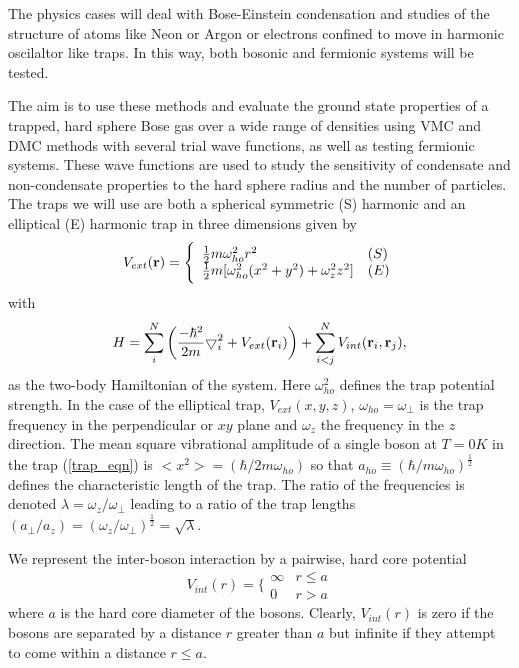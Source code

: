 \documentclass[%
oneside,                 %
final,                   %
10pt]{article}
\begin{document}
The physics cases will deal with Bose-Einstein condensation and studies
of the structure of atoms like Neon or Argon or electrons confined to move in harmonic oscilaltor like traps. 
In this way, both bosonic and fermionic systems will be tested.


The aim is to use these methods and evaluate 
the ground state properties of
a trapped, hard sphere Bose gas over a wide range of densities
using VMC and DMC  methods with several 
trial wave functions, as well as testing fermionic systems. These wave functions are used 
to study the sensitivity of condensate and 
non-condensate properties to the hard sphere radius and the number 
of particles.
The traps we will use are both a spherical symmetric (S) harmonic and 
an elliptical (E) harmonic trap in three dimensions given by 
 \begin{equation}
V_{ext}({\bf r}) = 
\Bigg\{
\begin{array}{ll}
        \frac{1}{2}m\omega_{ho}^2r^2 & (S)\\
\strut
	\frac{1}{2}m[\omega_{ho}^2(x^2+y^2) + \omega_z^2z^2] & (E)
\label{trap_eqn}
\end{array}
\end{equation}
with 
\begin{equation}
    H = \sum_i^N \left(
        \frac{-\hbar^2}{2m}
        { \bigtriangledown }_{i}^2 +
        V_{ext}({\bf{r}}_i)\right)  +
        \sum_{i<j}^{N} V_{int}({\bf{r}}_i,{\bf{r}}_j),
\end{equation}
as the two-body Hamiltonian of the system.
Here $\omega_{ho}^2$ defines the trap potential strength.  In the case of the
elliptical trap, $V_{ext}(x,y,z)$, $\omega_{ho}=\omega_{\perp}$ is the trap frequency
in the perpendicular or $xy$ plane and $\omega_z$ the frequency in the $z$
direction.
The mean square vibrational amplitude of a single boson at $T=0K$ in the 
trap (\ref{trap_eqn}) is $<x^2>=(\hbar/2m\omega_{ho})$ so that 
$a_{ho} \equiv (\hbar/m\omega_{ho})^{\frac{1}{2}}$ defines the 
characteristic length
of the trap.  The ratio of the frequencies is denoted 
$\lambda=\omega_z/\omega_{\perp}$ leading to a ratio of the
trap lengths
$(a_{\perp}/a_z)=(\omega_z/\omega_{\perp})^{\frac{1}{2}} = \sqrt{\lambda}$.

We represent the inter-boson interaction by a pairwise, hard core potential
\begin{equation}
V_{int}(r) =  \Bigg\{
\begin{array}{ll}
        \infty & r \leq a\\
        0 & {r} > a
\end{array}
\end{equation}
where $a$ is the hard core diameter of the bosons.  Clearly, $V_{int}(r)$
is zero if the bosons are separated by a distance $r$ greater than $a$ but
infinite if they attempt to come within a distance $r \leq a$.
\end{document}
